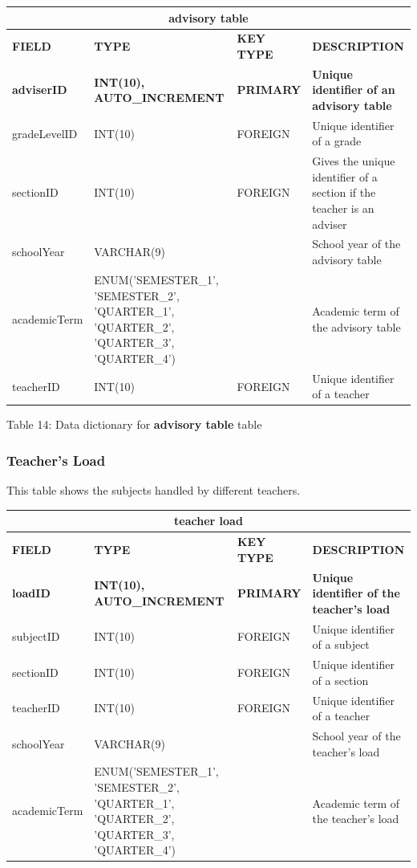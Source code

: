 \documentclass[11pt,a4paper,titlepage]{article}
\begin{document}
\vspace{.5cm}
\begin{longtable}{ |p{2.5cm}|p{4.5cm}|p{2.5cm}|p{3cm}|  }
    \hline
    \multicolumn{4}{|c|}{\textbf{advisory table}} \\
    \hline
    \textbf{FIELD}&\textbf{TYPE}&\textbf{KEY TYPE}&\textbf{DESCRIPTION}\\
    \hline
    \textbf{adviserID}  & \textbf{INT(10), AUTO\_INCREMENT} & \textbf{PRIMARY} & \textbf{Unique identifier of an advisory table}\\ \hline
    gradeLevelID   & INT(10) & FOREIGN & Unique identifier of a grade   \\ \hline
    sectionID   & INT(10)   & FOREIGN & Gives the unique identifier of a section if the teacher is an adviser\\ \hline
    schoolYear   & VARCHAR(9)   & & School year of the advisory table\\ \hline
    academicTerm   & ENUM('SEMESTER\_1', 'SEMESTER\_2', 'QUARTER\_1', 'QUARTER\_2', 'QUARTER\_3', 'QUARTER\_4')   & & Academic term of the advisory table\\ \hline
    teacherID & INT(10) & FOREIGN & Unique identifier of a teacher\\ \hline
\end{longtable}

\vspace{.5cm}
\begin{center}
    Table 14: Data dictionary for \textbf{advisory table} table
\end{center}


\subsubsection{Teacher's Load}

This table shows the subjects handled by different teachers.

\vspace{1cm}
\begin{longtable}{ |p{2.5cm}|p{4.5cm}|p{2.5cm}|p{3cm}|  }
    \hline
    \multicolumn{4}{|c|}{\textbf{teacher load}} \\
    \hline
    \textbf{FIELD}&\textbf{TYPE}&\textbf{KEY TYPE}&\textbf{DESCRIPTION}\\
    \hline
    \textbf{loadID}  & \textbf{INT(10), AUTO\_INCREMENT} & \textbf{PRIMARY} & \textbf{Unique identifier of the teacher's load}\\ \hline
    subjectID   & INT(10) & FOREIGN & Unique identifier of a subject\\ \hline
    sectionID   & INT(10) & FOREIGN & Unique identifier of a section\\ \hline
    teacherID   & INT(10) & FOREIGN & Unique identifier of a teacher\\ \hline
    schoolYear   & VARCHAR(9)   & & School year of the teacher's load\\ \hline
    academicTerm   & ENUM('SEMESTER\_1', 'SEMESTER\_2', 'QUARTER\_1', 'QUARTER\_2', 'QUARTER\_3', 'QUARTER\_4')   & & Academic term of the teacher's load\\ \hline
\end{longtable}
\end{document}
